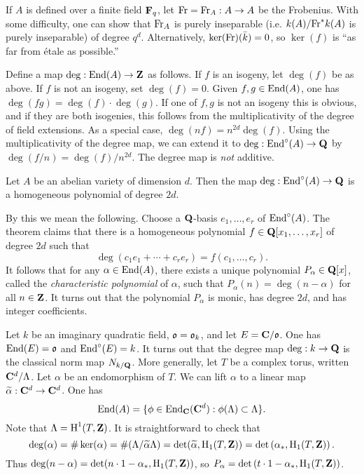 \begin{example}
If $A$ is defined over a finite field $\mathbf{F}_q$, let $\mathrm{Fr}=\mathrm{Fr}_A:A\to A$ 
be the Frobenius. With some difficulty, one can show that $\mathrm{Fr}_A$ is purely 
inseparable (i.e. $k(A)/\mathrm{Fr}^\ast k(A)$ is purely inseparable) of degree 
$q^d$. Alternatively, $\ker(\mathrm{Fr})(\bar k)=0$, so $\ker(f)$ is ``as far from 
\'etale as possible.'' 
\end{example}

Define a map $\deg:\operatorname{End}(A) \to \mathbf{Z}$ as follows. If $f$ is an isogeny, let 
$\deg(f)$  be as above. If $f$ is not an isogeny, set $\deg(f)=0$. Given 
$f,g\in \operatorname{End}(A)$, one has $\deg(f g)=\deg(f)\cdot \deg(g)$. If one of $f,g$ is 
not an isogeny this is obvious, and if they are both isogenies, this follows 
from the multiplicativity of the degree of field extensions. As a special case, 
$\deg(n f)=n^{2 d}\deg(f)$. Using the multiplicativity of the degree map, we 
can extend it to $\deg:\operatorname{End}^\circ(A)\to \mathbf{Q}$ by $\deg(f/n) = \deg(f)/n^{2 d}$. 
The degree map is \emph{not} additive. 

\begin{theorem}
Let $A$ be an abelian variety of dimension $d$. Then the map 
$\deg:\operatorname{End}^\circ(A) \to \mathbf{Q}$ is a homogeneous polynomial of degree $2 d$. 
\end{theorem}

By this we mean the following. Choose a $\mathbf{Q}$-basis $e_1,\dots,e_r$ of 
$\operatorname{End}^\circ(A)$. The theorem claims that there is a homogeneous polynomial 
$f\in \mathbf{Q}[x_1,\dots,x_r]$ of degree $2 d$ such that 
\[
  \deg\left(c_1 e_1 + \cdots + c_r e_r\right) = f(c_1,\dots,c_r) \text{.}
\]
It follows that for any $\alpha\in \operatorname{End}(A)$, there exists a unique polynomial 
$P_\alpha\in \mathbf{Q}[x]$, called the \emph{characteristic polynomial} of $\alpha$, 
such that $P_\alpha(n) = \deg(n-\alpha)$ for all $n\in \mathbf{Z}$. It turns out that 
the polynomial $P_\alpha$ is monic, has degree $2 d$, and has integer 
coefficients. 

\begin{example}
Let $k$ be an imaginary quadratic field, $\mathfrak{o}=\mathfrak{o}_k$, and let 
$E=\mathbf{C}/\mathfrak{o}$. One has $\operatorname{End}(E)=\mathfrak{o}$ and $\operatorname{End}^\circ(E)=k$. It turns out that the 
degree map $\deg:k\to \mathbf{Q}$ is the classical norm map $N_{k/\mathbf{Q}}$.
More generally, let $T$ be a complex torus, written $\mathbf{C}^d/\Lambda$. Let 
$\alpha$ be an endomorphism of $T$. We can lift $\alpha$ to a linear map 
$\widetilde\alpha:\mathbf{C}^d\to \mathbf{C}^d$. One has 
\[
  \operatorname{End}(A) = \{\phi\in \operatorname{End}_{\mathbf{C}}(\mathbf{C}^d) : \phi(\Lambda)\subset \Lambda\} \text{.}
\]
Note that $\Lambda=\operatorname{H}^1(T,\mathbf{Z})$. It is straightforward to check that 
\[
  \deg(\alpha) 
    = \#\ker(\alpha) 
    = \# (\Lambda/\widetilde\alpha\Lambda) 
    = \det(\widetilde\alpha,\operatorname{H}_1(T,\mathbf{Z})) 
    = \det\left(\alpha_\ast,\operatorname{H}_1(T,\mathbf{Z})\right) \text{.}
\]
Thus $\deg(n-\alpha)=\det(n\cdot 1-\alpha_\ast,\operatorname{H}_1(T,\mathbf{Z}))$, so 
$P_\alpha=\det\left(t\cdot 1-\alpha_\ast,\operatorname{H}_1(T,\mathbf{Z})\right)$. 
\end{example}

